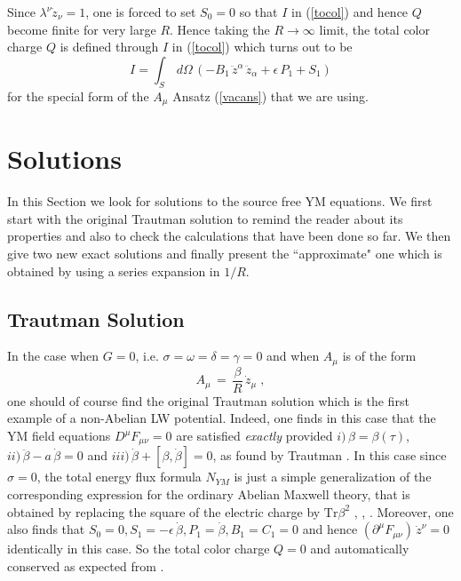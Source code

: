 \documentclass[a4paper,twocolumn,prd,showpacs,amsmath,amssymb]{revtex4}
\begin{document}
Since $\lambda^{\nu} \dot{z}_{\nu} =1$, one is forced to set $S_{0} = 0$ so that
$I$ in (\ref{tocol}) and hence $Q$ become finite for very large $R$. Hence taking
the $R \to \infty$ limit, the total color charge $Q$ is defined through $I$
in (\ref{tocol}) which turns out to be
\[ I = \int_{S} \, d\Omega \, (-B_{1} \, \ddot{z}^{\alpha} \, \ddot{z}_{\alpha}
+ \epsilon \, P_{1} + S_{1}) \]
for the special form of the $A_{\mu}$ Ansatz (\ref{vacans}) that we are using.

\section{\label{sols} Solutions}

In this Section we look for solutions to the source free YM equations. We first
start with the original Trautman solution to remind the reader about its
properties and also to check the calculations that have been done so far.
We then give two new exact solutions and finally present the ``approximate" one
which is obtained by using a series expansion in $1/R$.

\subsection{\label{trasol} Trautman Solution}

In the case when $G=0$, i.e. $\sigma=\omega=\delta=\gamma=0$ and
when $A_{\mu}$ is of the form
\begin{equation}
A_{\mu} \, = \, \frac{\beta}{R} \, \dot{z}_{\mu} \; ,
\label{solseca}
\end{equation}
one should of course find the original Trautman solution which is the first
example of a non-Abelian LW potential. Indeed, one finds in this case that
the YM field equations $D^{\mu} F_{\mu\nu}=0$ are satisfied {\it exactly}
provided $i) \, \beta = \beta(\tau)$, $ii) \, \ddot{\beta} - a \, \dot{\beta} = 0$
and $iii) \, \dot{\beta} + [\beta,\dot{\beta}]=0$,
as found by Trautman \cite{traut}. In this case since $\sigma=0$, the total
energy flux formula $N_{YM}$ is just a simple generalization of the
corresponding expression for the ordinary Abelian Maxwell theory, that is
obtained by replacing the square of the electric charge by $\mbox{Tr} \beta^2$
\cite{bar}, \cite{traut}, \cite{gs1}. Moreover, one also finds that
$S_{0}=0, S_{1}= - \epsilon \, \dot{\beta}, P_{1}= \dot{\beta}, B_{1}=C_{1}=0$
and hence $(\partial^{\mu} F_{\mu\nu}) \, \dot{z}^{\nu} =0$ identically in
this case. So the total color charge $Q=0$ and automatically conserved as
expected from \cite{traut}.
\end{document}
